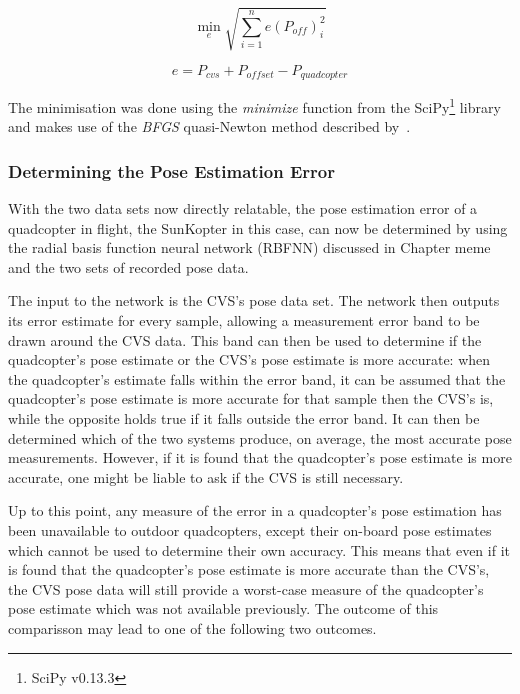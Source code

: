 \begin{equation}
  \label{eq:chap5-err-func}
  \min_{e}\sqrt{\displaystyle\sum_{i=1}^{n} e(P_{off})_i^2}
\end{equation}

\begin{equation}
  \label{eq:chap5-err-term}
  e = P_{cvs} + P_{offset} - P_{quadcopter}
\end{equation}

The minimisation was done using the \emph{minimize} function from the SciPy\footnote{SciPy v0.13.3} library and makes use of the \emph{BFGS} quasi-Newton method described by~\cite{nocedal2006numerical}. 

\subsubsection{Determining the Pose Estimation Error}

With the two data sets now directly relatable, the pose estimation error of a quadcopter in flight, the SunKopter in this case, can now be determined by using the radial basis function neural network (RBFNN) discussed in Chapter meme and the two sets of recorded pose data.  

The input to the network is the CVS's pose data set. The network then outputs its error estimate for every sample, allowing a measurement error band to be drawn around the CVS data. This band can then be used to determine if the quadcopter's pose estimate or the CVS's pose estimate is more accurate: when the quadcopter's estimate falls within the error band, it can be assumed that the quadcopter's pose estimate is more accurate for that sample then the CVS's is, while the opposite holds true if it falls outside the error band. It can then be determined which of the two systems produce, on average, the most accurate pose measurements. However, if it is found that the quadcopter's pose estimate is more accurate, one might be liable to ask if the CVS is still necessary.

Up to this point, any measure of the error in a quadcopter's pose estimation has been unavailable to outdoor quadcopters, except their on-board pose estimates which cannot be used to determine their own accuracy. This means that even if it is found that the quadcopter's pose estimate is more accurate than the CVS's, the CVS pose data will still provide a worst-case measure of the quadcopter's pose estimate which was not available previously. The outcome of this comparisson may lead to one of the following two outcomes.

